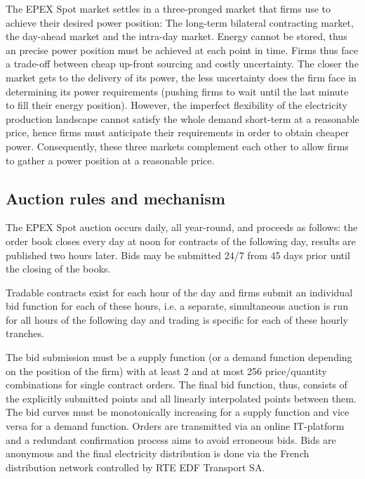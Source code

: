 
The EPEX Spot market settles in a three-pronged market that firms use to achieve their desired power position: The long-term bilateral contracting market, the day-ahead market and the intra-day market. Energy cannot be stored, thus an precise power position must be achieved at each point in time. Firms thus face a trade-off between cheap up-front sourcing and costly uncertainty. The closer the market gets to the delivery of its power, the less uncertainty does the firm face in determining its power requirements (pushing firms to wait until the last minute to fill their energy position). However, the imperfect flexibility of the electricity production landscape cannot satisfy the whole demand short-term at a reasonable price, hence firms must anticipate their requirements in order to obtain cheaper power. Consequently, these three markets complement each other to allow firms to gather a power position at a reasonable price. 


\subsection{Auction rules and mechanism}
\label{epexrules}
The EPEX Spot auction occurs daily, all year-round, and proceeds as follows: the order book closes every day at noon for contracts of the following day, results are published two hours later. Bids may be submitted 24/7 from 45 days prior until the closing of the books. 

Tradable contracts exist for each hour of the day and firms submit an individual bid function for each of these hours, i.e. a separate, simultaneous auction is run for all hours of the following day and trading is specific for each of these hourly tranches.  

The bid submission must be a supply function (or a demand function depending on the position of the firm) with at least 2 and at most 256 price/quantity combinations for single contract orders. The final bid function, thus, consists of the explicitly submitted points and all linearly interpolated points between them. The bid curves must be monotonically increasing for a supply function and vice versa for a demand function. Orders are transmitted via an online IT-platform and a redundant confirmation process aims to avoid erroneous bids. Bids are anonymous and the final electricity distribution is done via the French distribution network controlled by RTE EDF Transport SA. 

